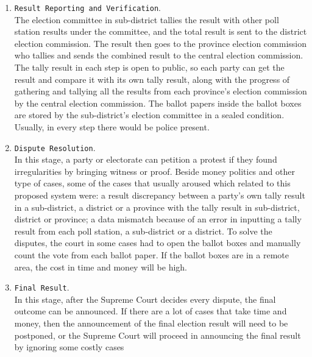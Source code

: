 \documentclass[JIP]{ipsj}
\def\|{\verb|}
\begin{document}
\begin{enumerate}
After voting time is up, the ballot box is opened, and the counting begins in every poll station. The tally result will then be declared in the poll station, with all available witnesses from political parties and electorates singing the official tally result on the poll station. After that, all ballots are put in ballot boxes and sealed, and together with the result, they are sent to its sub-district election committee.

\item \|Result Reporting and Verification|.\\
The election committee in sub-district tallies the result with other poll station results under the committee, and the total result is sent to the district election commission. The result then goes to the province election commission who tallies and sends the combined result to the central election commission. The tally result in each step is open to public, so each party can get the result and compare it with its own tally result, along with the progress of gathering and tallying all the results from each province's election commission by the central election commission. The ballot papers inside the ballot boxes are stored by the sub-district's election committee in a sealed condition. Usually, in every step there would be police present.

\item \|Dispute Resolution|.\\
In this stage, a party or electorate can petition a protest if they found irregularities by bringing witness or proof. Beside money politics and other type of cases, some of the cases that usually aroused which related to this proposed system were: a result discrepancy between a party's own tally result in a sub-district, a district or a province with the tally result in sub-district, district or province; a data mismatch because of an error in inputting a tally result from each poll station, a sub-district or a district. To solve the disputes, the court in some cases had to open the ballot boxes and manually count the vote from each ballot paper. If the ballot boxes are in a remote area, the cost in time and money will be high.

\item \|Final Result|.\\
In this stage, after the Supreme Court decides every dispute, the final outcome can be announced. If there are a lot of cases that take time and money, then the announcement of the final election result will need to be postponed, or the Supreme Court will proceed in announcing the final result by ignoring some costly cases
\end{enumerate}%
\end{document}

